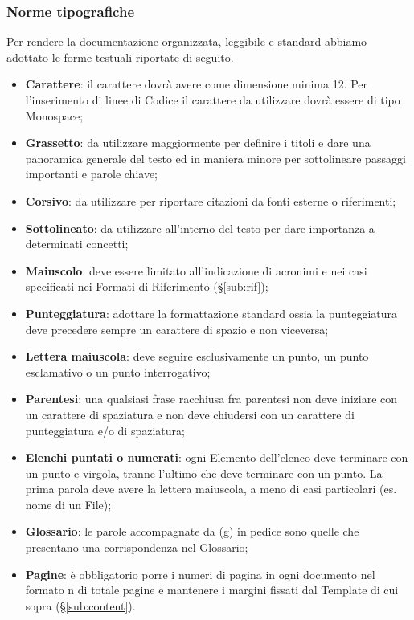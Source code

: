 {{		\subsubsection{Norme tipografiche}{
			\label{sub:typo}
			Per rendere la documentazione organizzata, leggibile e standard abbiamo adottato le forme testuali riportate di seguito.
			\begin{itemize}
				\item \textbf{Carattere}: il carattere dovrà avere come dimensione minima 12. Per l'inserimento di linee di Codice il carattere da utilizzare dovrà essere di tipo Monospace;
				\item \textbf{Grassetto}: da utilizzare maggiormente per definire i titoli e dare una panoramica generale del testo ed in maniera minore per sottolineare passaggi importanti e parole chiave;
				\item \textbf{Corsivo}: da utilizzare per riportare citazioni da fonti esterne o riferimenti;
				\item \textbf{Sottolineato}: da utilizzare all'interno del testo per dare importanza a determinati concetti;
				\item \textbf{Maiuscolo}: deve essere limitato all’indicazione di acronimi e nei casi specificati nei Formati di Riferimento (\S\ref{sub:rif});
				\item \textbf{Punteggiatura}: adottare la formattazione standard ossia la punteggiatura deve precedere sempre un carattere di spazio e non viceversa;
				\item \textbf{Lettera maiuscola}: deve seguire esclusivamente un punto, un punto esclamativo o un punto interrogativo;
				\item \textbf{Parentesi}: una qualsiasi frase racchiusa fra parentesi non deve iniziare con un carattere di spaziatura e non deve chiudersi con un carattere di punteggiatura e/o di spaziatura;
				\item \textbf{Elenchi puntati o numerati}: ogni Elemento dell’elenco deve terminare con un punto e virgola, tranne l’ultimo che deve terminare con un punto. La prima parola deve avere la lettera maiuscola, a meno di casi particolari (es. nome di un File);
				\item \textbf{Glossario}: le parole accompagnate da (g) in pedice sono quelle che presentano una corrispondenza nel Glossario;
				\item \textbf{Pagine}: è obbligatorio porre i numeri di pagina in ogni documento nel formato {n} di {totale pagine} e mantenere i margini fissati dal Template di cui sopra (\S\ref{sub:content}).
			\end{itemize}
		}
}}
